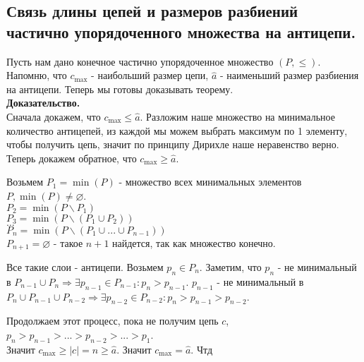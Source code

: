 \subsection{Связь длины цепей и размеров разбиений частично упорядоченного множества на антицепи.}

Пусть нам дано конечное частично упорядоченное множество $(P, \leq)$. Напомню, что $c_{\max}$ - наибольший размер цепи, $\hat{a}$ - наименьший размер разбиения на антицепи.
Теперь мы готовы доказывать теорему.\\

\noindent \textbf{Доказательство.}\\

Сначала докажем, что $c_{\max} \leq \hat{a}$. Разложим наше множество на минимальное количество антицепей, из каждой мы можем выбрать максимум по 1 элементу,
чтобы получить цепь, значит по принципу Дирихле наше неравенство верно.\\

Теперь докажем обратное, что $c_{\max} \geq \hat{a}$.

\begin{center}
    Возьмем $P_1 = \min (P)$ - множество всех минимальных элементов $P, \min (P) \neq \varnothing$.\\
    $P_2 = \min(P \backslash P_1)$\\
    $P_3 = \min(P \backslash (P_1 \cup P_2))$\\
    $\dots$\\
    $P_n = \min(P \backslash (P_1 \cup ... \cup P_{n - 1}))$\\
    $P_{n + 1} = \varnothing$ - такое $n + 1$ найдется, так как множество конечно.
\end{center}

Все такие слои - антицепи. Возьмем $p_n \in P_n$. Заметим, что $p_n$ - не минимальный в $P_{n - 1} \cup P_n \Rightarrow \exists p_{n - 1} \in P_{n - 1} : p_n > p_{n - 1}$.
$p_{n - 1}$ - не минимальный в $P_n \cup P_{n - 1} \cup P_{n - 2} \Rightarrow \exists p_{n - 2} \in P_{n - 2} : p_n > p_{n - 1} > p_{n - 2}$.

Продолжаем этот процесс, пока не получим цепь $c$, $p_n > p_{n - 1} > ... > p_{n - 2} > ... > p_1$.\\

Значит $c_{\max} \geq |c| = n \geq \hat{a}$. Значит $c_{\max} = \hat{a}$. Чтд
